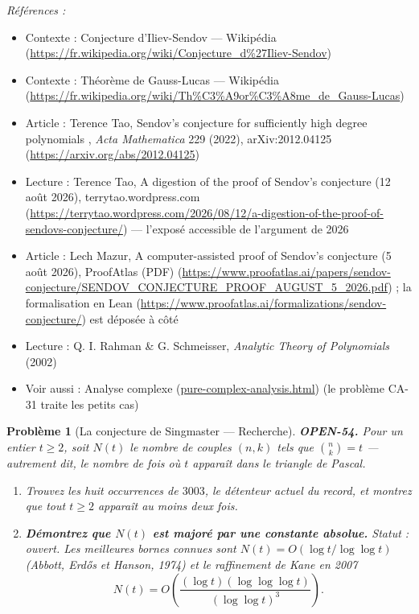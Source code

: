 \documentclass[11pt]{article}
\newtheorem{problem}{Problème}
\newenvironment{refs}{\par\small\noindent\emph{Références :}\begin{itemize}\setlength\itemsep{0pt}}{\end{itemize}\normalsize}
\begin{document}
\begin{refs}
\item Contexte : Conjecture d'Iliev-Sendov --- Wikipédia (\url{https://fr.wikipedia.org/wiki/Conjecture_d%27Iliev-Sendov})
\item Contexte : Théorème de Gauss-Lucas --- Wikipédia (\url{https://fr.wikipedia.org/wiki/Th%C3%A9or%C3%A8me_de_Gauss-Lucas})
\item Article : Terence Tao, \og{} Sendov's conjecture for sufficiently high degree polynomials \fg{}, \textit{Acta Mathematica} 229 (2022), arXiv:2012.04125 (\url{https://arxiv.org/abs/2012.04125})
\item Lecture : Terence Tao, \og{} A digestion of the proof of Sendov's conjecture \fg{} (12 août 2026), terrytao.wordpress.com (\url{https://terrytao.wordpress.com/2026/08/12/a-digestion-of-the-proof-of-sendovs-conjecture/}) --- l'exposé accessible de l'argument de 2026
\item Article : Lech Mazur, \og{} A computer-assisted proof of Sendov's conjecture \fg{} (5 août 2026), ProofAtlas (PDF) (\url{https://www.proofatlas.ai/papers/sendov-conjecture/SENDOV_CONJECTURE_PROOF_AUGUST_5_2026.pdf}) ; la formalisation en Lean (\url{https://www.proofatlas.ai/formalizations/sendov-conjecture/}) est déposée à côté
\item Lecture : Q. I. Rahman \& G. Schmeisser, \textit{Analytic Theory of Polynomials} (2002)
\item Voir aussi : Analyse complexe (\url{pure-complex-analysis.html}) (le problème CA-31 traite les petits cas)
\end{refs}

\bigskip

\begin{problem}[{La conjecture de Singmaster --- Recherche}]
\textbf{OPEN-54.} Pour un entier $ t \geq 2 $, soit $ N(t) $ le nombre de couples
$ (n,k) $ tels que $ \binom{n}{k} = t $ --- autrement dit, le nombre de fois où $ t $
apparaît dans le triangle de Pascal.
\begin{enumerate}
\item[(a)] Trouvez les huit occurrences de $ 3003 $, le détenteur actuel du record, et montrez
que tout $ t \geq 2 $ apparaît au moins deux fois.
\item[(b)] \textbf{Démontrez que $ N(t) $ est majoré par une constante absolue.} Statut :
ouvert. Les meilleures bornes connues sont $ N(t) = O(\log t / \log\log t) $ (Abbott,
Erd\H{o}s et Hanson, 1974) et le raffinement de Kane en 2007
\[ N(t) = O\!\left( \frac{(\log t)(\log\log\log t)}{(\log\log t)^{3}} \right) . \]
\end{enumerate}

\end{problem}
\end{document}
